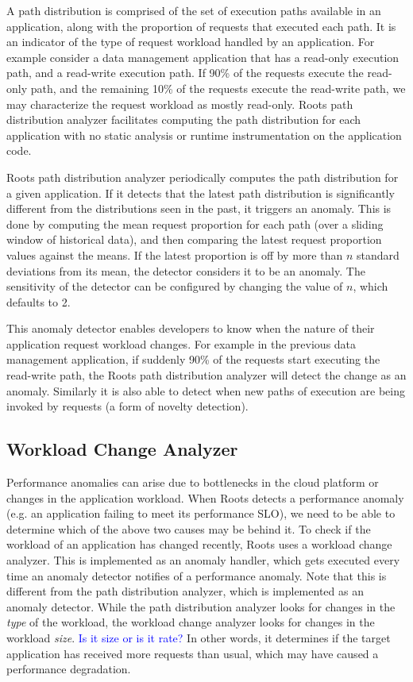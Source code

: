 A path distribution is comprised of the set of execution paths available in an application, along
with the proportion of requests that executed each path.
It is an indicator of the type of request workload handled by an application.
For example consider a data management application that has a read-only execution path, and a read-write 
execution path. If 90\% of the requests execute the read-only path, and the remaining 10\% of the requests
execute the read-write path, we may characterize the request workload as mostly read-only. 
Roots path distribution analyzer facilitates computing the path distribution for each application
with no static analysis or runtime instrumentation on the application code.

Roots path distribution analyzer periodically computes the path distribution for a given application.
If it detects that the latest path distribution is significantly different from the distributions seen in the 
past, it triggers an anomaly. This is done by computing the mean request proportion for each path
(over a sliding window of historical data),
and then comparing the latest request proportion values against the means. If the latest proportion
is off by more than $n$ standard deviations from its mean, the detector considers it to be an
anomaly. The sensitivity of the detector can be configured by changing the value of $n$, which
defaults to 2. 

This anomaly detector enables developers to know when the nature of their application request
workload changes. For example in the previous data management application, if suddenly 90\%
of the requests start executing the read-write path, the Roots path distribution analyzer will
detect the change as an anomaly. Similarly it is also able to detect when new paths of execution
are being invoked by requests (a form of novelty detection).

\subsection{Workload Change Analyzer}
Performance anomalies can arise due to bottlenecks in the cloud platform or changes in the application
workload.
When Roots detects a performance anomaly (e.g. an application failing to meet its performance SLO),
we need to be able to determine which of the above two causes may be behind it.
To check if the workload of an application has changed recently, Roots uses a workload change analyzer.
This is implemented as an anomaly handler, which gets executed every time an anomaly detector
notifies of a performance anomaly. Note that this is different from the path distribution analyzer,
which is implemented as an anomaly detector. While the path distribution analyzer looks for changes in the
\textit{type} of the workload, the workload change analyzer looks for changes
in the workload \textit{size}. \textcolor{blue}{Is it size or is it rate?}
In other words, it determines if the target application has received more requests than usual, which
may have caused a performance degradation.

